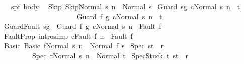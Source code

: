 \begin{isabellebody}
\ \ \ {\isasymGamma}{\isacharcolon}{\isacharcolon}{\isachardoublequoteopen}{\isacharparenleft}{\isacharprime}s{\isacharcomma}{\isacharprime}p{\isacharcomma}{\isacharprime}f{\isacharparenright}\ body{\isachardoublequoteclose}\isanewline
{}\isanewline
\ \ Skip{\isacharcolon}\ {\isachardoublequoteopen}{\isasymGamma}{\isasymturnstile}{\isasymlangle}Skip{\isacharcomma}Normal\ s{\isasymrangle}\ {\isacharequal}n{\isasymRightarrow}\ \ Normal\ s{\isachardoublequoteclose}\isanewline
{\isacharbar}\ Guard{\isacharcolon}\ {\isachardoublequoteopen}{\isasymlbrakk}s{\isasymin}g{\isacharsemicolon}\ {\isasymGamma}{\isasymturnstile}{\isasymlangle}c{\isacharcomma}Normal\ s{\isasymrangle}\ {\isacharequal}n{\isasymRightarrow}\ \ t{\isasymrbrakk}\ \isanewline
\ \ \ \ \ \ \ \ \ \ {\isasymLongrightarrow}\ \isanewline
\ \ \ \ \ \ \ \ \ \ {\isasymGamma}{\isasymturnstile}{\isasymlangle}Guard\ f\ g\ c{\isacharcomma}Normal\ s{\isasymrangle}\ {\isacharequal}n{\isasymRightarrow}\ \ t{\isachardoublequoteclose}\isanewline
\isanewline
{\isacharbar}\ GuardFault{\isacharcolon}\ {\isachardoublequoteopen}s{\isasymnotin}g\ {\isasymLongrightarrow}\ {\isasymGamma}{\isasymturnstile}{\isasymlangle}Guard\ f\ g\ c{\isacharcomma}Normal\ s{\isasymrangle}\ {\isacharequal}n{\isasymRightarrow}\ \ Fault\ f{\isachardoublequoteclose}\isanewline
\isanewline
{\isacharbar}\ FaultProp\ {\isacharbrackleft}intro{\isacharcomma}simp{\isacharbrackright}{\isacharcolon}\ {\isachardoublequoteopen}{\isasymGamma}{\isasymturnstile}{\isasymlangle}c{\isacharcomma}Fault\ f{\isasymrangle}\ {\isacharequal}n{\isasymRightarrow}\ \ Fault\ f{\isachardoublequoteclose}\ \isanewline
\isanewline
{\isacharbar}\ Basic{\isacharcolon}\ {\isachardoublequoteopen}{\isasymGamma}{\isasymturnstile}{\isasymlangle}Basic\ f{\isacharcomma}Normal\ s{\isasymrangle}\ {\isacharequal}n{\isasymRightarrow}\ \ Normal\ {\isacharparenleft}f\ s{\isacharparenright}{\isachardoublequoteclose}\isanewline
\isanewline
{\isacharbar}\ Spec{\isacharcolon}\ {\isachardoublequoteopen}{\isacharparenleft}s{\isacharcomma}t{\isacharparenright}\ {\isasymin}\ r\ \isanewline
\ \ \ \ \ \ \ \ \ {\isasymLongrightarrow}\ \isanewline
\ \ \ \ \ \ \ \ \ {\isasymGamma}{\isasymturnstile}{\isasymlangle}Spec\ r{\isacharcomma}Normal\ s{\isasymrangle}\ {\isacharequal}n{\isasymRightarrow}\ \ Normal\ t{\isachardoublequoteclose}\isanewline
\isanewline
{\isacharbar}\ SpecStuck{\isacharcolon}\ {\isachardoublequoteopen}{\isasymforall}t{\isachardot}\ {\isacharparenleft}s{\isacharcomma}t{\isacharparenright}\ {\isasymnotin}\ r\ \isanewline
\ \ \ \ \ \ \ \ \ \ \ \ \ \ {\isasymLongrightarrow}\ \isanewline

\end{isabellebody}
